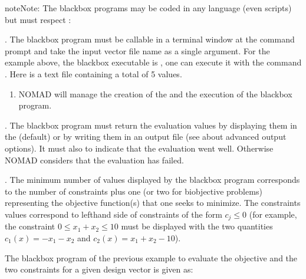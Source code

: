 \documentclass[letterpaper,10pt,english]{sphinxmanual}
\begin{document}
\begin{sphinxadmonition}{note}{Note:}
\sphinxAtStartPar
The blackbox programs may be coded in any language (even scripts) but must respect :

. The blackbox program must be callable in a terminal window at the command prompt and take the input vector file name as a single argument.
For the example above, the blackbox executable is , one can execute it with the command  . Here  is a text file containing a total of 5 values.
\begin{enumerate}
%
\setcounter{enumi}{1}
\item {} 
\sphinxAtStartPar
NOMAD will manage the creation of the  and the execution of the blackbox program.

\end{enumerate}

. The blackbox program must return the evaluation values by displaying them in the  (default) or by writing them in an output file (see {\hyperref[\detokenize{AdvancedFunctionalities:advanced-functionalities}]{}} about advanced output options).
It must also  to indicate that the evaluation went well. Otherwise NOMAD considers that the evaluation has failed.

. The minimum number of values displayed by the blackbox program corresponds to the number of constraints plus one (or two for bi\sphinxhyphen{}objective problems) representing the objective function(s) that one seeks to minimize.
The constraints values correspond to left\sphinxhyphen{}hand side of constraints of the form \(c_j \leq 0\) (for example, the constraint \(0 \leq x_1 + x_2 \leq 10\) must be displayed with the two quantities \(c_1(x)=-x_1-x_2\) and \(c_2(x)=x_1+x_2-10\)).
\end{sphinxadmonition}

\sphinxAtStartPar
The blackbox  program of the previous example to evaluate the objective and the two constraints for a given design vector is given as:
\end{document}

